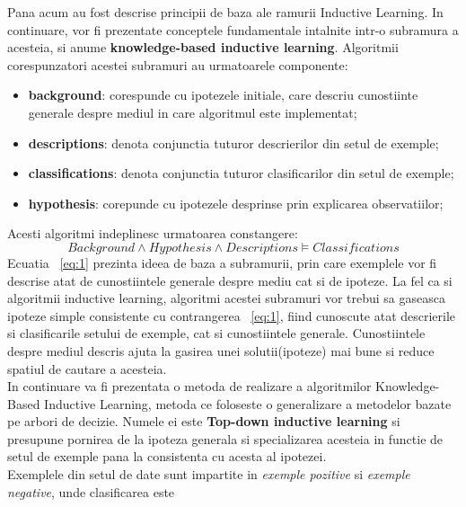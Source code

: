 \documentclass[a4paper,12pt]{report}
\begin{document}
	Pana acum au fost descrise principii de baza ale ramurii Inductive Learning. In continuare, vor fi prezentate conceptele fundamentale intalnite intr-o subramura a acesteia, si anume \textbf{knowledge-based inductive learning}.  Algoritmii corespunzatori acestei subramuri au urmatoarele componente:
\begin{itemize}
\item \textbf{background}: corespunde cu ipotezele initiale, care descriu cunostiinte generale despre mediul in care algoritmul este implementat;
\item \textbf{descriptions}: denota conjunctia tuturor descrierilor din setul de exemple;
\item \textbf{classifications}: denota conjunctia tuturor clasificarilor din setul de exemple;
\item \textbf{hypothesis}: corepunde cu ipotezele desprinse prin explicarea observatiilor; 
\end{itemize}
Acesti algoritmi indeplinesc urmatoarea constangere:
\begin{equation} \label{eq:1}
Background \wedge Hypothesis \wedge Descriptions \models Classifications
\end{equation}
	Ecuatia ~\ref{eq:1} prezinta ideea de baza a subramurii, prin care exemplele vor fi descrise atat de cunostiintele generale despre mediu cat si de ipoteze. La fel ca si algoritmii inductive learning, algoritmi acestei subramuri vor trebui sa gaseasca ipoteze simple consistente cu contrangerea ~\ref{eq:1}, fiind cunoscute atat descrierile si clasificarile setului de exemple, cat si cunostiintele generale. Cunostiintele despre mediul descris ajuta la gasirea unei solutii(ipoteze) mai bune si reduce spatiul de cautare a acesteia.\\
	In continuare va fi prezentata o metoda de realizare a algoritmilor Knowledge-Based Inductive Learning, metoda ce foloseste o generalizare a metodelor bazate pe arbori de decizie. Numele ei  este \textbf{Top-down inductive learning} si presupune pornirea de la ipoteza generala si specializarea acesteia in functie de setul de exemple pana la consistenta cu acesta al ipotezei. \\
	Exemplele din setul de date sunt impartite in \textit{exemple pozitive} si \textit{exemple negative}, unde clasificarea este 
\end{document}
